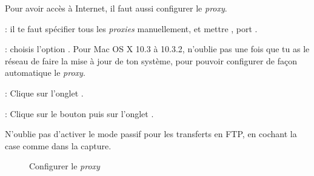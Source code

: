   


Pour avoir accès à Internet, il faut aussi configurer le \emph{proxy}.


 : il te faut spécifier tous les
\emph{proxies} manuellement, et mettre , port .

 :  choisis l'option . Pour Mac OS X 10.3 à 10.3.2, n'oublie pas une fois que tu as le réseau de faire la mise à jour de ton système, pour pouvoir configurer de façon automatique le \emph{proxy}.

 : Clique sur l'onglet .

 : Clique sur le bouton  puis sur l'onglet .

N'oublie pas d'activer le mode passif pour les transferts en FTP, en cochant la case comme dans la capture.


  \begin{figure}[!hl]
    \begin{center}
      \hspace{0.1 \textwidth}
      \caption{Configurer le \emph{proxy}}
    \end{center}
  \end{figure}
  
